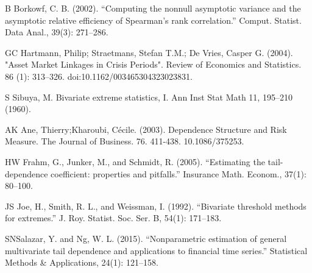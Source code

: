 \documentclass[mstat,12pt]{unswthesis}  %
\numberwithin{equation}{section}
\begin{document}
\begin{thebibliography}{999}
\bibitem
{B} Borkowf, C. B. (2002). “Computing the nonnull asymptotic variance and the asymptotic
relative efficiency of Spearman’s rank correlation.” Comput. Statist. Data Anal.,
39(3): 271–286.

\bibitem
{GC} Hartmann, Philip; Straetmans, Stefan T.M.; De Vries, Casper G. (2004). "Asset Market Linkages in Crisis Periods". Review of Economics and Statistics. 86 (1): 313–326. doi:10.1162/003465304323023831.

\bibitem
{S} Sibuya, M. Bivariate extreme statistics, I. Ann Inst Stat Math 11, 195–210 (1960).

\bibitem
{AK} Ane, Thierry;Kharoubi, Cécile. (2003). Dependence Structure and Risk Measure. The Journal of Business. 76. 411-438. 10.1086/375253. 

\bibitem
{HW} Frahm, G., Junker, M., and Schmidt, R. (2005). “Estimating the tail-dependence coefficient:
properties and pitfalls.” Insurance Math. Econom., 37(1): 80–100.

\bibitem
{JS} Joe, H., Smith, R. L., and Weissman, I. (1992). “Bivariate threshold methods for extremes.”
J. Roy. Statist. Soc. Ser. B, 54(1): 171–183.


\bibitem
{SN}Salazar, Y. and Ng, W. L. (2015). “Nonparametric estimation of general multivariate
tail dependence and applications to financial time series.” Statistical Methods \& Applications, 24(1): 121–158.





\end{thebibliography}
\end{document}
